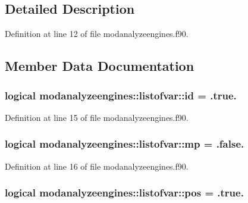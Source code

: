 \subsection{Detailed Description}


Definition at line 12 of file modanalyzeengines.\+f90.



\subsection{Member Data Documentation}
\subsubsection[{\texorpdfstring{id}{id}}]{\setlength{\rightskip}{0pt plus 5cm}logical modanalyzeengines\+::listofvar\+::id = .true.}\hypertarget{structmodanalyzeengines_1_1listofvar_a2804cb221c94cd32057d1f5552781a85}{}\label{structmodanalyzeengines_1_1listofvar_a2804cb221c94cd32057d1f5552781a85}


Definition at line 15 of file modanalyzeengines.\+f90.

\subsubsection[{\texorpdfstring{mp}{mp}}]{\setlength{\rightskip}{0pt plus 5cm}logical modanalyzeengines\+::listofvar\+::mp = .false.}\hypertarget{structmodanalyzeengines_1_1listofvar_a62147398645606799b7c50fb43da1cf2}{}\label{structmodanalyzeengines_1_1listofvar_a62147398645606799b7c50fb43da1cf2}


Definition at line 16 of file modanalyzeengines.\+f90.

\subsubsection[{\texorpdfstring{pos}{pos}}]{\setlength{\rightskip}{0pt plus 5cm}logical modanalyzeengines\+::listofvar\+::pos = .true.}\hypertarget{structmodanalyzeengines_1_1listofvar_a56fa237dca88fe3d71d4cf27ac53026c}{}\label{structmodanalyzeengines_1_1listofvar_a56fa237dca88fe3d71d4cf27ac53026c}


